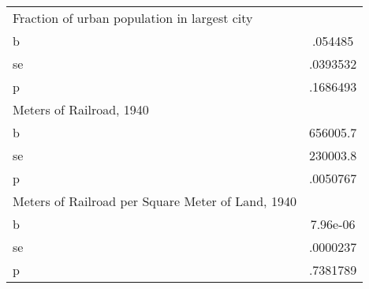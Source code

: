 \begin{tabular}{l*{1}{c}}
\midrule
Fraction of urban population in largest city&         \\
b               &  .054485\\
se              & .0393532\\
p               & .1686493\\
\midrule
Meters of Railroad, 1940&         \\
b               & 656005.7\\
se              & 230003.8\\
p               & .0050767\\
\midrule
Meters of Railroad per Square Meter of Land, 1940&         \\
b               & 7.96e-06\\
se              & .0000237\\
p               & .7381789\\
\bottomrule
\end{tabular}
